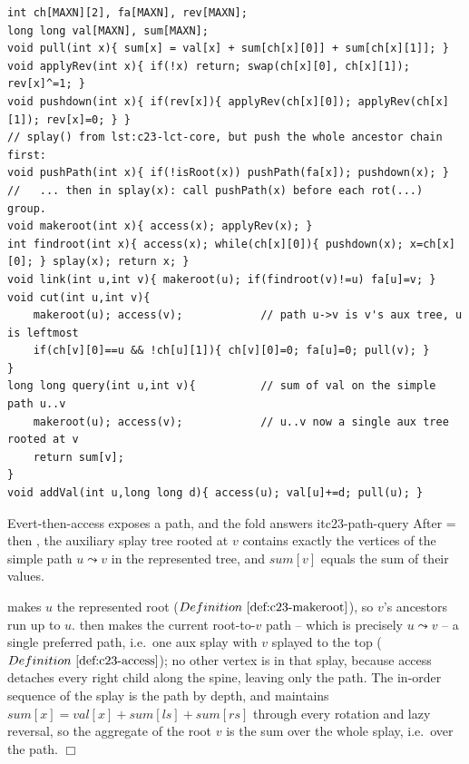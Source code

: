 \begin{lstlisting}[caption={Adding evert power to the LCT core: pull, apply-reverse, pushdown, makeroot, link, cut, and a path-sum query. Children ls/rs, aggregate sum[], per-node val[], lazy rev[]. Call pushdown top-down inside splay before rotating. ASCII only}, label={lst:c23-evert}]
int ch[MAXN][2], fa[MAXN], rev[MAXN];
long long val[MAXN], sum[MAXN];
void pull(int x){ sum[x] = val[x] + sum[ch[x][0]] + sum[ch[x][1]]; }
void applyRev(int x){ if(!x) return; swap(ch[x][0], ch[x][1]); rev[x]^=1; }
void pushdown(int x){ if(rev[x]){ applyRev(ch[x][0]); applyRev(ch[x][1]); rev[x]=0; } }
// splay() from lst:c23-lct-core, but push the whole ancestor chain first:
void pushPath(int x){ if(!isRoot(x)) pushPath(fa[x]); pushdown(x); }
//   ... then in splay(x): call pushPath(x) before each rot(...) group.
void makeroot(int x){ access(x); applyRev(x); }
int findroot(int x){ access(x); while(ch[x][0]){ pushdown(x); x=ch[x][0]; } splay(x); return x; }
void link(int u,int v){ makeroot(u); if(findroot(v)!=u) fa[u]=v; }
void cut(int u,int v){
    makeroot(u); access(v);            // path u->v is v's aux tree, u is leftmost
    if(ch[v][0]==u && !ch[u][1]){ ch[v][0]=0; fa[u]=0; pull(v); }
}
long long query(int u,int v){          // sum of val on the simple path u..v
    makeroot(u); access(v);            // u..v now a single aux tree rooted at v
    return sum[v];
}
void addVal(int u,long long d){ access(u); val[u]+=d; pull(u); }
\end{lstlisting}

\begin{theorem}{Evert-then-access exposes a path, and the fold answers it}{c23-path-query}
After  =  then , the auxiliary
splay tree rooted at \(v\) contains exactly the vertices of the simple path
\(u\leadsto v\) in the represented tree, and \(\mathit{sum}[v]\) equals the sum of
their values.
\end{theorem}
\begin{proofbox}
 makes \(u\) the represented root (\(\defref{c23-makeroot}\)), so
\(v\)'s ancestors run up to \(u\).  then makes the current
root-to-\(v\) path -- which is precisely \(u\leadsto v\) -- a single preferred path,
i.e.\ one aux splay with \(v\) splayed to the top (\(\defref{c23-access}\)); no
other vertex is in that splay, because access detaches every right child along the
spine, leaving only the path. The in-order sequence of the splay is the path by
depth, and  maintains \(\mathit{sum}[x]=\mathit{val}[x]+
\mathit{sum}[\mathit{ls}]+\mathit{sum}[\mathit{rs}]\) through every rotation and
lazy reversal, so the aggregate of the root \(v\) is the sum over the whole splay,
i.e.\ over the path. \(\Box\)
\end{proofbox}

